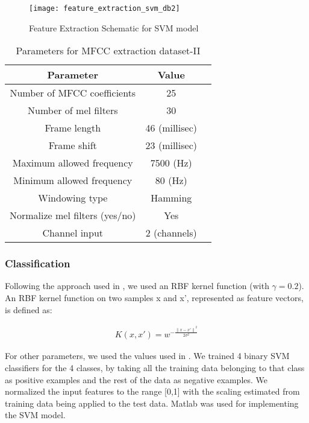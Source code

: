 \begin{figure}[!htb] 
\centering 
\texttt{[image: feature\_extraction\_svm\_db2]}
\caption[Feature Extraction Schematic for SVM model]{Feature Extraction Schematic for SVM model}
\label{fig:feature_extraction_svm_db2} 
\end{figure}

\begin{table}[tb]
\caption[Parameters for MFCC extraction for SVM for dataset-II]{Parameters for MFCC extraction dataset-II}
\label{tab:param_mfcc_svm_db2}
\centering
\begin{tabular}{ccc}
\toprule
Parameter & Value \\
\midrule
Number of MFCC coefficients	& 25\\
Number of mel filters	& 30\\
Frame length & 46 (millisec)\\
Frame shift 	& 23 (millisec)\\
Maximum allowed frequency & 7500 (Hz)\\
Minimum allowed frequency & 80 (Hz)\\
Windowing type & Hamming\\
Normalize mel filters (yes/no) & Yes \\
Channel input & 2 (channels) \\
\bottomrule 
\end{tabular}
\end{table}

\subsubsection{Classification}
Following the approach used in \cite{kons2013audio}, we used an RBF kernel function (with $\gamma = 0.2$). An RBF kernel function on two samples x and x', represented as feature vectors, is defined as:

\begin{eqnarray*}
K(x,x') = w^{-\frac{{\|x-x'\|}^2}{2\sigma^2}}
\end{eqnarray*}

For other parameters, we used the values used in \cite{kons2013audio}. We trained 4 binary SVM classifiers for the 4 classes, by taking all the training data belonging to that class as positive examples and the rest of the data as negative examples. We normalized the input features to the range [0,1] with the scaling estimated from training data being applied to the test data. Matlab was used for implementing the SVM model.

